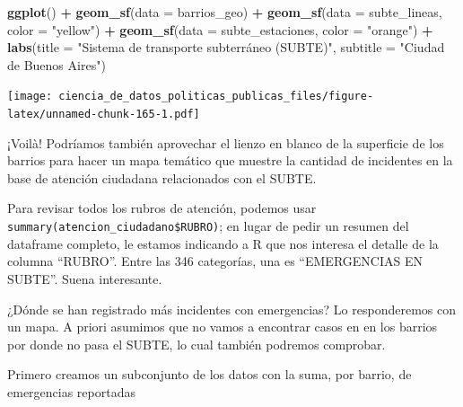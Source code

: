 \documentclass[]{book}
\newenvironment{Shaded}{\begin{snugshade}}{\end{snugshade}}
\newcommand{\KeywordTok}[1]{\textcolor[rgb]{0.13,0.29,0.53}{\textbf{#1}}}
\newcommand{\DataTypeTok}[1]{\textcolor[rgb]{0.13,0.29,0.53}{#1}}
\newcommand{\StringTok}[1]{\textcolor[rgb]{0.31,0.60,0.02}{#1}}
\newcommand{\OperatorTok}[1]{\textcolor[rgb]{0.81,0.36,0.00}{\textbf{#1}}}
\newcommand{\NormalTok}[1]{#1}
\begin{document}
\begin{Shaded}
\begin{Highlighting}[]
\KeywordTok{ggplot}\NormalTok{() }\OperatorTok{+}
\StringTok{    }\KeywordTok{geom_sf}\NormalTok{(}\DataTypeTok{data =}\NormalTok{ barrios_geo) }\OperatorTok{+}
\StringTok{    }\KeywordTok{geom_sf}\NormalTok{(}\DataTypeTok{data =}\NormalTok{ subte_lineas, }\DataTypeTok{color =} \StringTok{"yellow"}\NormalTok{) }\OperatorTok{+}
\StringTok{    }\KeywordTok{geom_sf}\NormalTok{(}\DataTypeTok{data =}\NormalTok{ subte_estaciones, }\DataTypeTok{color =} \StringTok{"orange"}\NormalTok{) }\OperatorTok{+}
\StringTok{    }\KeywordTok{labs}\NormalTok{(}\DataTypeTok{title =} \StringTok{"Sistema de transporte subterráneo (SUBTE)"}\NormalTok{,}
         \DataTypeTok{subtitle =} \StringTok{"Ciudad de Buenos Aires"}\NormalTok{)}
\end{Highlighting}
\end{Shaded}

\texttt{[image: ciencia\_de\_datos\_politicas\_publicas\_files/figure-latex/unnamed-chunk-165-1.pdf]}

¡Voilà! Podríamos también aprovechar el lienzo en blanco de la
superficie de los barrios para hacer un mapa temático que muestre la
cantidad de incidentes en la base de atención ciudadana relacionados con
el SUBTE.

Para revisar todos los rubros de atención, podemos usar
\texttt{summary(atencion\_ciudadano\$RUBRO)}; en lugar de pedir un
resumen del dataframe completo, le estamos indicando a R que nos
interesa el detalle de la columna ``RUBRO''. Entre las 346 categorías,
una es ``EMERGENCIAS EN SUBTE''. Suena interesante.

¿Dónde se han registrado más incidentes con emergencias? Lo
responderemos con un mapa. A priori asumimos que no vamos a encontrar
casos en en los barrios por donde no pasa el SUBTE, lo cual también
podremos comprobar.

Primero creamos un subconjunto de los datos con la suma, por barrio, de
emergencias reportadas

\begin{Shaded}
\end{Shaded}
\end{document}
